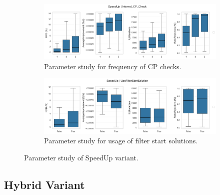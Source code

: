 \begin{figure}[!ht]
	\centering
	\begin{subfigure}[t]{\textwidth}
		\centering
		\includegraphics[width=\linewidth]{pictures/parameter_study/SpeedUp_Interval_CP_Check_parameter_study.png}
		\caption{Parameter study for frequency of CP checks.}
	\end{subfigure}
	\begin{subfigure}[t]{\textwidth}
		\centering
		\includegraphics[width=\linewidth]{pictures/parameter_study/SpeedUp_UseFilterStartSolution_parameter_study.png}
		\caption{Parameter study for usage of filter start solutions.}
	\end{subfigure}
	\caption{Parameter study of SpeedUp variant.}
\end{figure}

\clearpage
\subsection{Hybrid Variant}
\label{app:subsec:parameterstudy_Hybrid}

